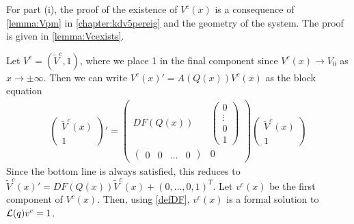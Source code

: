 \documentclass[thesis.tex]{subfiles}
\begin{document}
For part (i), the proof of the existence of $V^c(x)$ is a consequence of \cref{lemma:Vpm} in \cref{chapter:kdv5pereig} and the geometry of the system. The proof is given in \cref{lemma:Vcexists}. 

Let $V^c = (\tilde{V}^c, 1)$, where we place 1 in the final component since $V^c(x) \rightarrow V_0$ as $x \rightarrow \pm \infty$. Then we can write $V^c(x)' = A(Q(x))V^c(x)$ as the block equation
\begin{align*}
\begin{pmatrix}\tilde{V}^c(x) \\ 1 \end{pmatrix}' = 
\begin{pmatrix}
DF(Q(x)) & \begin{pmatrix} 0 \\ \vdots \\ 0 \\ 1 \end{pmatrix} \\
\begin{pmatrix} 0 & 0 & \dots & 0 \end{pmatrix} & 0
\end{pmatrix} 
\begin{pmatrix}\tilde{V}^c(x) \\ 1 \end{pmatrix}
\end{align*}
Since the bottom line is always satisfied, this reduces to $\tilde{V}^c(x)' = DF(Q(x)) \tilde{V}^c(x) + (0, \dots, 0, 1)^T$. Let $v^c(x)$ be the first component of $V^c(x)$. Then, using \eqref{defDF}, $v^c(x)$ is a formal solution to $\mathcal{L}(q)v^c = 1$.
\end{document}
